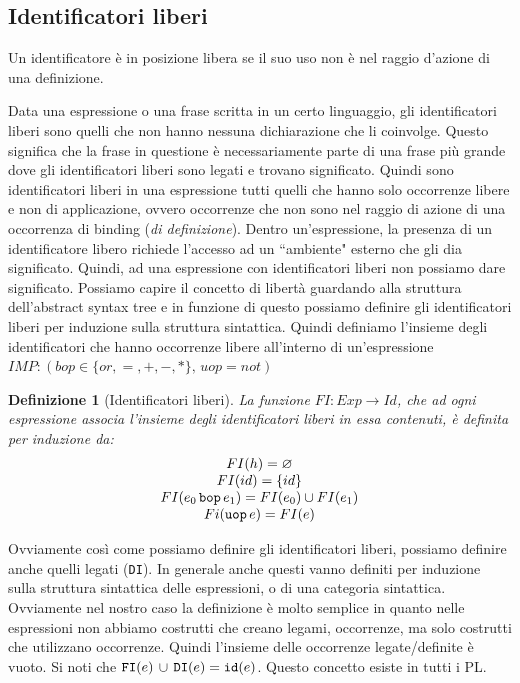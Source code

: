 \documentclass[oneside,a4paper,11pt]{book}
\theoremstyle{italicstyle}
\newtheorem{definizione}{Definizione}[section]
\theoremstyle{normStyle}
\begin{document}
\subsection{Identificatori liberi}
\begin{tcolorbox}[title={Occorrenza libera}]
  Un identificatore è in posizione libera se il suo uso non è nel raggio
  d'azione di una definizione.
\end{tcolorbox}
Data una espressione o una frase scritta in un certo linguaggio, gli identificatori 
liberi sono quelli che non hanno nessuna dichiarazione che li coinvolge. Questo
significa che la frase in questione è necessariamente parte di una frase più
grande dove gli identificatori liberi sono
legati e trovano significato.
Quindi sono identificatori liberi in una espressione tutti quelli
che hanno solo occorrenze libere e non di applicazione, ovvero
occorrenze che non sono nel raggio di azione di una occorrenza di binding
(\textit{di definizione}). Dentro un'espressione, la presenza di un
identificatore libero richiede l’accesso ad un “ambiente" esterno che
gli dia significato. Quindi, ad una espressione con identificatori liberi
non possiamo dare significato.
Possiamo capire il concetto di libertà guardando alla struttura
dell’abstract syntax tree e in funzione di questo possiamo definire
gli identificatori liberi per induzione sulla struttura sintattica.
Quindi definiamo l'insieme degli identificatori che hanno occorrenze
libere all'interno di un'espressione $IMP: (bop \in \{or,=,+,-,*\},\,uop=not)$
\begin{definizione}[Identificatori liberi]
  La funzione $FI:Exp\rightarrow Id$, che ad ogni espressione associa l'insieme 
  degli identificatori liberi in essa contenuti, è definita per induzione da:
  \[
  \begin{matrix}
    FI(h)=\varnothing \\
    FI(id)=\{id\}\\
    FI(e_0 \,\verb|bop| \,e_1) = FI(e_0) \cup FI(e_1) \\
    Fi(\verb|uop| \,e)=FI(e)
  \end{matrix}  
  \]
\end{definizione}
Ovviamente così come possiamo definire gli identificatori liberi, possiamo definire anche 
quelli legati (\verb|DI|). In generale anche questi vanno definiti per induzione sulla 
struttura sintattica delle espressioni, o di una categoria sintattica. Ovviamente nel nostro
caso la definizione è molto semplice in quanto nelle espressioni non abbiamo costrutti che creano 
legami, occorrenze, ma solo costrutti che utilizzano occorrenze. Quindi l'insieme delle occorrenze 
legate/definite è vuoto. Si noti che $\verb|FI|(e)\,\cup\,\verb|DI|(e)=\verb|id|(e)$. Questo concetto 
esiste in tutti i PL.
\end{document}
